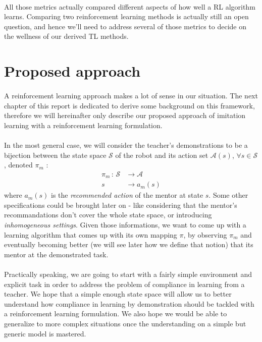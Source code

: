\documentclass[a4paper]{report}
\begin{document}
{{{				\paragraph{} All those metrics actually compared different aspects of how well a RL algorithm learns. Comparing two reinforcement learning methods is actually still an open question, and hence we'll need to address several of those metrics to decide on the wellness of our derived TL methods. 
			}
		}
		\section{Proposed approach}
		{
			\paragraph{} A reinforcement learning approach makes a lot of sense in our situation. The next chapter of this report is dedicated to derive some background on this framework, therefore we will hereinafter only describe our proposed approach of imitation learning with a reinforcement learning formulation. 
			
			\paragraph{} In the most general case, we will consider the teacher's demonstrations to be a bijection between the state space $\mathcal{S}$ of the robot and its action set $\mathcal{A}(s)$, $\forall s\in\mathcal{S}$, denoted $\pi_m$ : 
			\begin{equation}
				\begin{aligned}
					\pi_m \, :  \, \mathcal{S} &\to \mathcal{A}\\
						     s &\to a_m(s) 
				\end{aligned}
			\end{equation}
			where $a_m(s)$ is the \emph{recommended action} of the mentor at state $s$. Some other specifications could be brought later on - like considering that the mentor's recommandations don't cover the whole state space, or introducing \emph{inhomogeneous settings}. Given those informations, we want to come up with a learning algorithm that comes up with its own mapping $\pi$, by observing $\pi_m$ and eventually becoming better (we will see later how we define that notion) that its mentor at the demonstrated task. 
			

			\paragraph{} Practically speaking, we are going to start with a fairly simple environment and explicit task in order to address the problem of compliance in learning from a teacher. We hope that a simple enough state space will allow us to better understand how compliance in learning by demonstration should be tackled with a reinforcement learning formulation.  We also hope we would be able to generalize to more complex situations once the understanding on a simple but generic model is mastered. 
			
}}
\end{document}
